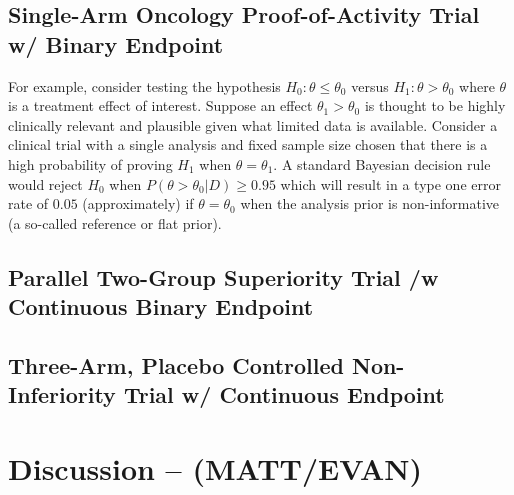\documentclass[12pt]{article}
\begin{document}
\subsection{Single-Arm Oncology Proof-of-Activity Trial w/ Binary Endpoint}
For example, consider testing the hypothesis $H_0:\theta\leq\theta_0$ versus $H_1:\theta>\theta_0$ where $\theta$ is a treatment effect of interest. Suppose an effect $\theta_1>\theta_0$ is thought to be highly clinically relevant and plausible given what limited data is available. Consider a clinical trial with a single analysis and fixed sample size chosen that there is a high probability of proving $H_1$ when $\theta=\theta_1$. A standard Bayesian decision rule would reject $H_0$ when $P(\theta>\theta_0|D)\geq 0.95$ which will result in a type one error rate of $0.05$ (approximately) if $\theta=\theta_0$ when the analysis prior is non-informative (a so-called reference or flat prior).
\subsection{Parallel Two-Group Superiority Trial /w Continuous Binary Endpoint}

\subsection{Three-Arm, Placebo Controlled Non-Inferiority Trial w/ Continuous Endpoint}

\section{Discussion -- (MATT/EVAN)}

%
%
%
%
%				
%
%
\end{document}
